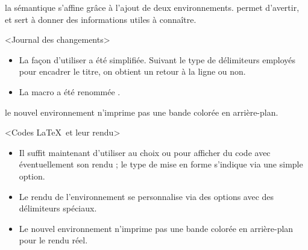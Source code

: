 

\begin{bdoctopic}
    la sémantique s'affine grâce à l'ajout de deux environnements.
     permet d'avertir,
    et
     sert à donner des informations utiles à connaître.
\end{bdoctopic}




\begin{bdoctopic}<Journal des changements>
    \begin{itemize}
        \item La façon d'utiliser  a été simplifiée. Suivant le type de délimiteurs employés pour encadrer le titre, on obtient un retour à la ligne ou non.

        \item La macro  a été renommée .
    \end{itemize}
\end{bdoctopic}




\begin{bdoctopic}
    le nouvel environnement  n'imprime pas une bande colorée en arrière-plan.
\end{bdoctopic}




\begin{bdoctopic}<Codes \LaTeX\ et leur rendu>
    \begin{itemize}
        \item Il suffit maintenant d'utiliser au choix  ou  pour afficher du code avec éventuellement son rendu ; le type de mise en forme s'indique via une simple option.

        \item Le rendu de l'environnement  se personnalise via des options avec des délimiteurs spéciaux.

        \item Le nouvel environnement  n'imprime pas une bande colorée en arrière-plan pour le rendu réel.
    \end{itemize}
\end{bdoctopic}




